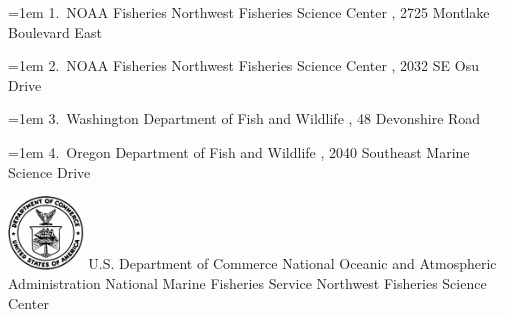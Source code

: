 \documentclass[
]{scrartcl}
\begin{document}
\begin{titlepage}
\begin{minipage}[b][\textheight][s]{\textwidth}
  \hangindent=1em
  {1}.~{NOAA Fisheries Northwest Fisheries Science Center}%
  , %
  {2725 Montlake Boulevard East}%
  \par\hangindent=1em%
  {2}.~{NOAA Fisheries Northwest Fisheries Science Center}%
  , %
  {2032 SE Osu Drive}%
  \par\hangindent=1em%
  {3}.~{Washington Department of Fish and Wildlife}%
  , %
  {48 Devonshire Road}%
  \par\hangindent=1em%
  {4}.~{Oregon Department of Fish and Wildlife}%
  , %
  {2040 Southeast Marine Science Drive}%


  \vspace{1\baselineskip}



  \vfill


  \vspace{1\baselineskip}

  \includegraphics[alt={},width=2cm]{support_files/us_doc_logo.png}\newline %
  U.S. Department of Commerce\newline
  National Oceanic and Atmospheric Administration\newline
  National Marine Fisheries Service\newline
  Northwest Fisheries Science Center\newline

  \end{minipage}
  \restoregeometry
  \end{titlepage}
\end{document}
